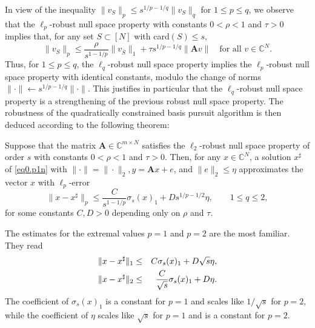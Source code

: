 In view of the inequality $\|v_S\|_p \leq s^{1/p-1/q}\|v_S\|_q$ for $1 \leq p \leq q$, we observe that the $\ell_p$-robust null space property with constants $ 0 <\rho < 1$ and $\tau > 0$ implies that, for any set $S \subset [N]$ with card$(S) \leq s$,
\[
    \|v_S\|_p \leq \frac{\rho}{s^{1-1/p}} \|v_{\overline{S}}\|_1 + \tau s^{1/p-1/q}\|\mathbf{A}v\| \quad \text{for all } v \in \mathbb{C}^N.
\]
Thus, for $1 \leq p \leq q$, the $\ell_q$-robust null space property implies the $\ell_p$-robust null space property with identical constants, modulo the change of norms $\|\cdot\| \leftarrow s^{1/p - 1/q}\|\cdot\|$. \textcolor[rgb]{1,0,0}{This justifies in particular that the $\ell_q$-robust null space property is a strengthening of the previous robust null space property}. The robustness of the quadratically constrained basis pursuit algorithm is then deduced according to the following theorem:
\begin{theorem}
    \label{th0.4.22}
    Suppose that the matrix $\mathbf{A} \in \mathbb{C}^{m \times N}$ satisfies the $\ell_2$-robust null space property of order $s$ with constants $0 <\rho <1$ and $\tau > 0$. Then, for any $x \in \mathbb{C}^N$, a solution $x^{\sharp}$ of \cref{eq0.p1n} with $\|\cdot\| = \|\cdot\|_2, y = \mathbf{A}x + e$, and $\|e\|_2 \leq \eta$ approximates the vector $x$ with $\ell_p$-error
    \begin{equation}
        \|x-x^{\sharp}\|_p \leq \frac{C}{s^{1-1/p}} \sigma_s(x)_1 + D s^{1/p-1/2}\eta, \qquad 1 \leq q \leq 2,
        \label{eq0.4.15}
    \end{equation}
    for some constants $C,D>0$ depending only on $\rho$ and $\tau$.
\end{theorem}

The estimates for the extremal values $p=1$ and $p=2$ are the most familiar. They read
\begin{eqnarray}
    \label{eqn0.4.16}
    \|x - x^{\sharp}\|_1 &\leq& C \sigma_s(x)_1 + D \sqrt{s}\eta, \notag \\
    \|x-x^{\sharp}\|_2 &\leq& \frac{C}{\sqrt{s}} \sigma_s(x)_1 + D \eta.
\end{eqnarray}
The coefficient of $\sigma_s(x)_1$ \textcolor[rgb]{1,0,0}{is a constant for $p=1$ and scales like $1/\sqrt{s}$ for $p=2$}, while the coefficient of $\eta$ \textcolor[rgb]{1,0,0}{scales like $\sqrt{s}$ for $p=1$ and is a constant for $p=2$}. 

